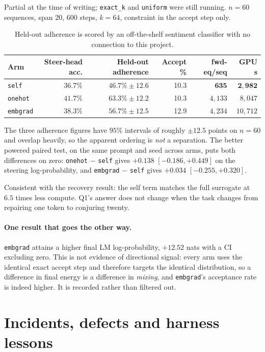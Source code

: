 \documentclass[11pt,a4paper]{article}
\begin{document}
Partial at the time of writing; \texttt{exact\_k} and \texttt{uniform} were still
running. $n=60$ sequences, span $20$, $600$ steps, $k=64$, constraint in the accept step
only.

\begin{table}[htbp]
\centering
\begin{tabular}{lrrrrr}
\toprule
Arm & Steer-head acc. & Held-out adherence & Accept \% & fwd-eq/seq & GPU s \\
\midrule
\texttt{self}    & $36.7\%$ & $46.7\% \pm 12.6$ & 10.3 & $\bm{635}$ & $\bm{2{,}982}$ \\
\texttt{onehot}  & $41.7\%$ & $63.3\% \pm 12.2$ & 10.3 & $4{,}133$ & $8{,}047$ \\
\texttt{embgrad} & $38.3\%$ & $56.7\% \pm 12.5$ & 12.9 & $4{,}234$ & $10{,}712$ \\
\bottomrule
\end{tabular}
\caption{Held-out adherence is scored by an off-the-shelf sentiment classifier with no
connection to this project.}
\end{table}

The three adherence figures have $95\%$ intervals of roughly $\pm 12.5$ points on $n=60$
and overlap heavily, so the apparent ordering is \emph{not} a separation. The better
powered paired test, on the same prompt and seed across arms, puts both differences on
zero: \texttt{onehot} $-$ \texttt{self} gives $+0.138$ $[-0.186,+0.449]$ on the steering
log-probability, and \texttt{embgrad} $-$ \texttt{self} gives $+0.034$ $[-0.255,+0.320]$.

Consistent with the recovery result: the self term matches the full surrogate at $6.5$
times less compute. Q1's answer does not change when the task changes from repairing one
token to conjuring twenty.

\paragraph{One result that goes the other way.}
\texttt{embgrad} attains a higher final LM log-probability, $+12.52$ nats with a CI
excluding zero. This is not evidence of directional signal: every arm uses the identical
exact accept step and therefore targets the identical distribution, so a difference in
final energy is a difference in \emph{mixing}, and \texttt{embgrad}'s acceptance rate is
indeed higher. It is recorded rather than filtered out.

\section{Incidents, defects and harness lessons}
\end{document}
